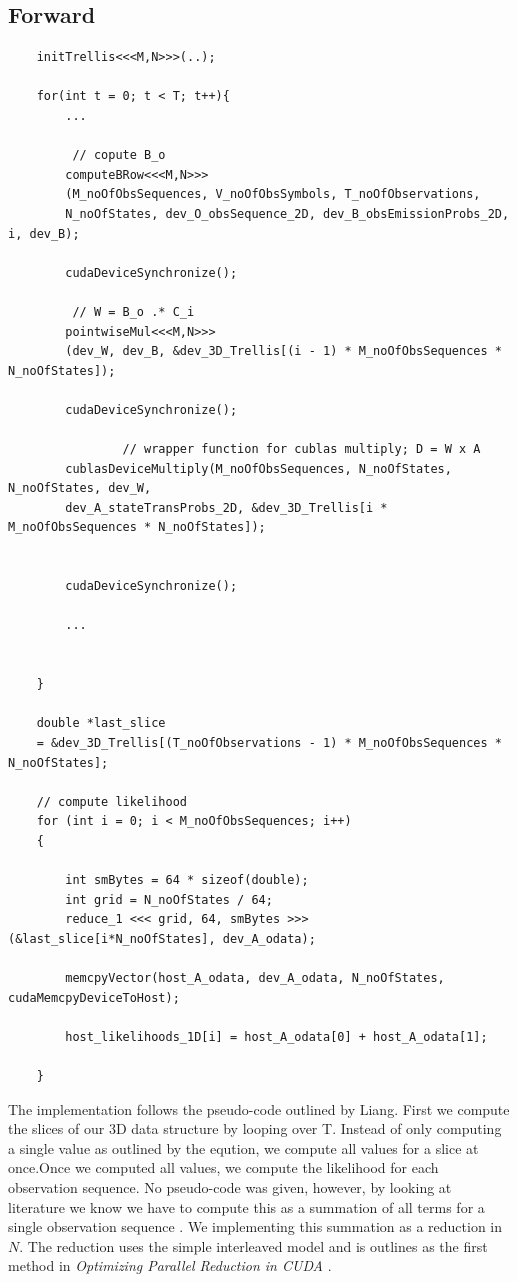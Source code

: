 \documentclass[english, paper=a4]{scrartcl}
\begin{document}
\subsection{Forward}
\begin{verbatim}
	initTrellis<<<M,N>>>(..);

	for(int t = 0; t < T; t++){
		...
		
		 // copute B_o
		computeBRow<<<M,N>>>
		(M_noOfObsSequences, V_noOfObsSymbols, T_noOfObservations, 
		N_noOfStates, dev_O_obsSequence_2D, dev_B_obsEmissionProbs_2D, i, dev_B);
		
		cudaDeviceSynchronize();
		
		 // W = B_o .* C_i
		pointwiseMul<<<M,N>>>
		(dev_W, dev_B, &dev_3D_Trellis[(i - 1) * M_noOfObsSequences * N_noOfStates]);
		
		cudaDeviceSynchronize();
		
				// wrapper function for cublas multiply; D = W x A
		cublasDeviceMultiply(M_noOfObsSequences, N_noOfStates, N_noOfStates, dev_W, 
		dev_A_stateTransProbs_2D, &dev_3D_Trellis[i * M_noOfObsSequences * N_noOfStates]); 

		
		cudaDeviceSynchronize();
		
		...
		
	
	}
	
	double *last_slice 
	= &dev_3D_Trellis[(T_noOfObservations - 1) * M_noOfObsSequences * N_noOfStates];	
	
	// compute likelihood
	for (int i = 0; i < M_noOfObsSequences; i++)
	{

		int smBytes = 64 * sizeof(double);
		int grid = N_noOfStates / 64;
		reduce_1 <<< grid, 64, smBytes >>>(&last_slice[i*N_noOfStates], dev_A_odata);

		memcpyVector(host_A_odata, dev_A_odata, N_noOfStates, cudaMemcpyDeviceToHost);

		host_likelihoods_1D[i] = host_A_odata[0] + host_A_odata[1];

	}

\end{verbatim}

The implementation follows the pseudo-code outlined by Liang. First we compute the slices of our 3D data structure by looping over T. Instead of only computing a single value as outlined by the eqution, we compute all values for a slice at once.Once we computed all values, we compute the likelihood for each observation sequence. No pseudo-code was given, however, by looking at literature we know we have to compute this as a summation of all terms for a single observation sequence \cite{hmm}. We implementing this summation as a reduction in \(N\). The reduction uses the simple interleaved model and is outlines as the first method in \textit{Optimizing Parallel Reduction in CUDA} \cite{reduction}.
\end{document}
